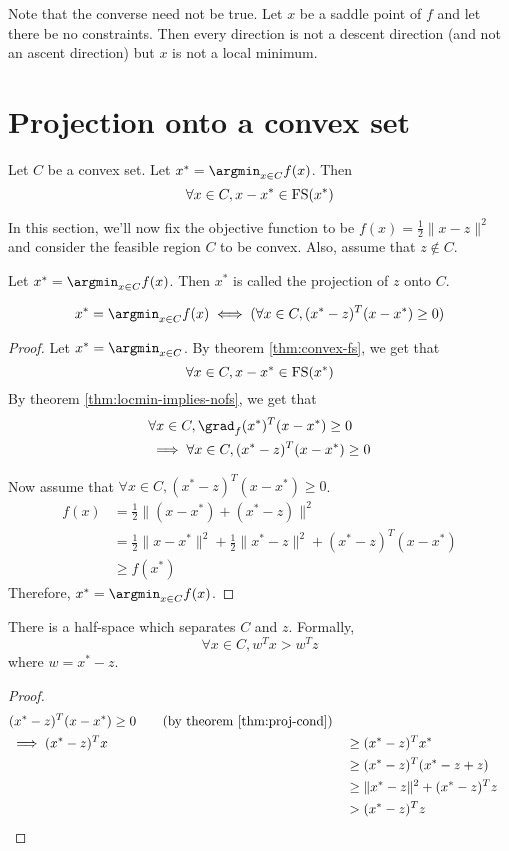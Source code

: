 Note that the converse need not be true.
Let $x$ be a saddle point of $f$ and let there be no constraints.
Then every direction is not a descent direction (and not an ascent direction)
but $x$ is not a local minimum.

\section{Projection onto a convex set}

\begin{theorem} \label{thm:convex-fs}
Let $C$ be a convex set. Let $x^* = \argmin_{x \in C} f(x)$. Then
\[ \forall x \in C, x-x^* \in \operatorname{FS}(x^*) \]
\end{theorem}

In this section, we'll now fix the objective function to be $f(x) = \frac{1}{2}\|x-z\|^2$
and consider the feasible region $C$ to be convex. Also, assume that $z \not\in C$.

\begin{definition}[Projection]
Let $x^* = \argmin_{x \in C} f(x)$.
Then $x^*$ is called the projection of $z$ onto $C$.
\end{definition}

\begin{theorem} \label{thm:proj-cond}
\[ x^* = \argmin_{x \in C} f(x) \iff (\forall x \in C, (x^*-z)^T(x-x^*) \ge 0) \]
\end{theorem}
\begin{proof}
Let $x^* = \argmin_{x \in C}$.
By theorem \ref{thm:convex-fs}, we get that
\[ \forall x \in C, x-x^* \in \operatorname{FS}(x^*) \]
By theorem \ref{thm:locmin-implies-nofs}, we get that
\begin{align*}
& \forall x \in C, \grad_f(x^*)^T(x-x^*) \ge 0
\\ &\implies \forall x \in C, (x^*-z)^T(x-x^*) \ge 0
\end{align*}

Now assume that $\forall x \in C, (x^*-z)^T(x-x^*) \ge 0$.
\begin{align*}
f(x) &= \frac{1}{2} \|(x-x^*)+(x^*-z)\|^2
\\ &= \frac{1}{2} \|x-x^*\|^2 + \frac{1}{2} \|x^*-z\|^2 + (x^*-z)^T(x-x^*)
\\ &\ge f(x^*)
\end{align*}
Therefore, $x^* = \argmin_{x \in C} f(x)$.
\end{proof}

\begin{theorem}
There is a half-space which separates $C$ and $z$. Formally,
\[ \forall x \in C, w^Tx > w^Tz \]
where $w = x^* - z$.
\end{theorem}
\begin{proof}
\begin{align*}
& (x^*-z)^T(x-x^*) \ge 0 \tag{by theorem \ref{thm:proj-cond}}
\\ & \implies (x^*-z)^T x & &\ge (x^*-z)^T x^*
\\ & & &\ge (x^*-z)^T (x^* - z + z)
\\ & & &\ge \|x^*-z\|^2 + (x^*-z)^T z
\\ & & &> (x^*-z)^T z
\end{align*}
\end{proof}

